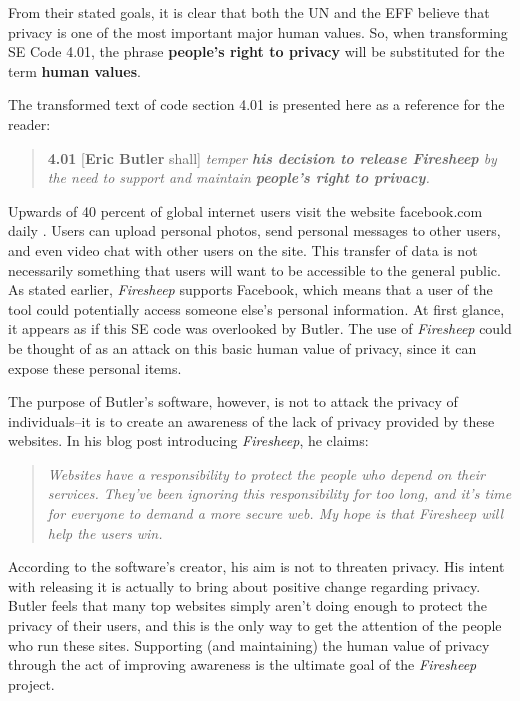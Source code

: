 \documentclass[11pt]{article}
\begin{document}
\begin{multicols}{2}
From their stated goals, it is clear that both the UN and the EFF believe that privacy is one of the most important major human values. So, when transforming SE Code 4.01, the phrase \textbf{people's right to privacy} will be substituted for the term \textbf{human values}.

The transformed text of code section 4.01 is presented here as a reference for the reader:

\begin{quote}
\textbf{4.01} [\textbf{Eric Butler} shall] \emph{temper \textbf{his decision to release Firesheep} by the need to support and maintain \textbf{people's right to privacy}.} \cite{se_code}
\end{quote}

Upwards of 40 percent of global internet users visit the website facebook.com daily \cite{alexa}. Users can upload personal photos, send personal messages to other users, and even video chat with other users on the site. This transfer of data is not necessarily something that users will want to be accessible to the general public. As stated earlier, \emph{Firesheep} supports Facebook, which means that a user of the tool could potentially access someone else's personal information. At first glance, it appears as if this SE code was overlooked by Butler. The use of \emph{Firesheep} could be thought of as an attack on this basic human value of privacy, since it can expose these personal items.

The purpose of Butler's software, however, is not to attack the privacy of individuals--it is to create an awareness of the lack of privacy provided by these websites. In his blog post introducing \emph{Firesheep}, he claims:

\begin{quote}
\emph{Websites have a responsibility to protect the people who depend on their services. They've been ignoring this responsibility for too long, and it's time for everyone to demand a more secure web. My hope is that Firesheep will help the users win.} \cite{codebutler_main}
\end{quote}

According to the software's creator, his aim is not to threaten privacy. His intent with releasing it is actually to bring about positive change regarding privacy. Butler feels that many top websites simply aren't doing enough to protect the privacy of their users, and this is the only way to get the attention of the people who run these sites. Supporting (and maintaining) the human value of privacy through the act of improving awareness is the ultimate goal of the \emph{Firesheep} project.


\end{multicols}
\end{document}

